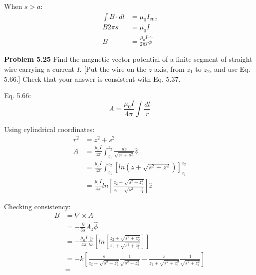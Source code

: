 \documentclass{article}
\begin{document}
When $s > a$:
\begin{equation*}
\begin{split}
	\int B \cdot dl & = \mu_0 I_{\text{enc}} \\
	B 2 \pi s & = \mu_0 I \\
	B & = \boxed{\frac{\mu_0 I}{2 \pi s} \hat{\phi}}
\end{split}
\end{equation*}

\textbf{Problem 5.25}
Find the magnetic vector potential of a finite segment of straight wire carrying a current $I$.
[Put the wire on the $z$-axis, from $z_1$ to $z_2$, and use Eq. 5.66.]
Check that your answer is consistent with Eq. 5.37.

Eq. 5.66:
$$A = \frac{\mu_0 I}{4 \pi} \int \frac{dl}{r}$$

Using cylindrical coordinates:
\begin{equation*}
\begin{split}
	r^2 & = z^2 + s^2 \\
	A & = \frac{\mu_0 I}{4 \pi} \int_{z_1}^{z_2} \frac{dz}{\sqrt{z^2 + s^2}} \hat{z} \\
	& = \frac{\mu_0 I}{4 \pi} \int_{z_1}^{z_2} [ln(z + \sqrt{s^2 + z^2})]_{z_1}^{z_2} \\
	& = \boxed{\frac{\mu_0 I}{4 \pi} ln[\frac{z_2 + \sqrt{s^2 + z_2^2}}{z_1 + \sqrt{s^2 + z_1^2}}] \hat{z}}
\end{split}
\end{equation*}

Checking consistency:
\begin{equation*}
\begin{split}
	B & = \nabla \times A \\
	& = - \frac{\partial}{\partial s} A_z \hat{\phi} \\
	& = - \frac{\mu_0 I}{4 \pi} \frac{\partial}{\partial s} [ln[\frac{z_2 + \sqrt{s^2 + z_2^2}}{z_1 + \sqrt{s^2 + z_1^2}}]] \\
	& = -k [\frac{s}{z_2 + \sqrt{s^2 + z_2^2}} \frac{1}{\sqrt{s^2 + z_2^2}} - \frac{s}{z_2 + \sqrt{s^2 + z_1^2}} \frac{1}{\sqrt{s^2 + z_1^2}}] \\
	& = 
\end{split}
\end{equation*}
\end{document}
